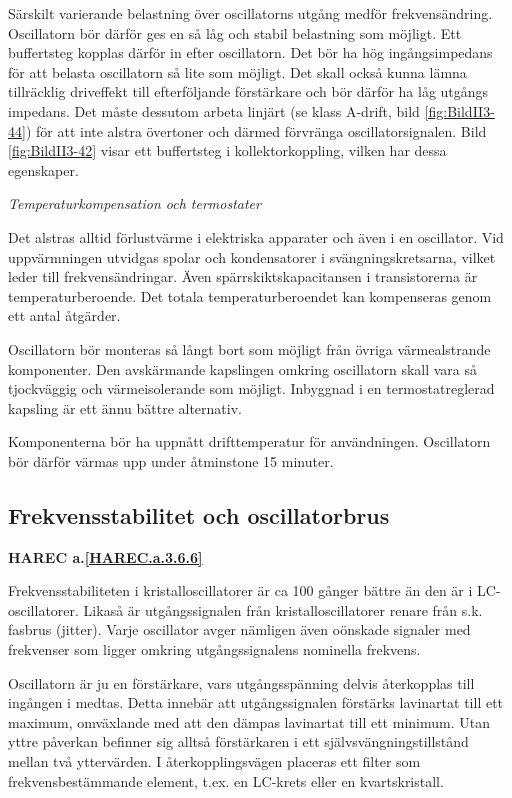 Särskilt varierande belastning över oscillatorns utgång medför
frekvensändring. Oscillatorn bör därför ges en så låg och stabil
belastning som möjligt. Ett buffertsteg kopplas därför in efter
oscillatorn. Det bör ha hög ingångsimpedans för att belasta
oscillatorn så lite som möjligt. Det skall också kunna lämna
tillräcklig driveffekt till efterföljande förstärkare och bör därför
ha låg utgångs impedans. Det måste dessutom arbeta linjärt (se klass
A-drift, bild \ref{fig:BildII3-44}) för att inte alstra övertoner och därmed
förvränga oscillatorsignalen. Bild \ref{fig:BildII3-42} visar ett buffertsteg i
kollektorkoppling, vilken har dessa egenskaper.

\emph{Temperaturkompensation och termostater}

Det alstras alltid förlustvärme i elektriska apparater och även i en
oscillator. Vid uppvärmningen utvidgas spolar och kondensatorer i
svängningskretsarna, vilket leder till frekvensändringar. Även
spärrskiktskapacitansen i transistorerna är temperaturberoende. Det
totala temperaturberoendet kan kompenseras genom ett antal åtgärder.

Oscillatorn bör monteras så långt bort som möjligt från övriga
värmealstrande komponenter. Den avskärmande kapslingen omkring
oscillatorn skall vara så tjockväggig och värmeisolerande som
möjligt. Inbyggnad i en termostatreglerad kapsling är ett ännu bättre
alternativ.

Komponenterna bör ha uppnått drifttemperatur för
användningen. Oscillatorn bör därför värmas upp under åtminstone 15
minuter.

\subsection{Frekvensstabilitet och oscillatorbrus}
\textbf{HAREC a.\ref{HAREC.a.3.6.6}\label{myHAREC.a.3.6.6}}

Frekvensstabiliteten i kristalloscillatorer är ca 100 gånger bättre än
den är i LC-oscillatorer. Likaså är utgångssignalen från
kristalloscillatorer renare från s.k. fasbrus (jitter). Varje
oscillator avger nämligen även oönskade signaler med frekvenser som
ligger omkring utgångssignalens nominella frekvens.

Oscillatorn är ju en förstärkare, vars utgångsspänning delvis
återkopplas till ingången i medtas. Detta innebär att utgångssignalen
förstärks lavinartat till ett maximum, omväxlande med att den dämpas
lavinartat till ett minimum. Utan yttre påverkan befinner sig alltså
förstärkaren i ett självsvängningstillstånd mellan två yttervärden. I
återkopplingsvägen placeras ett filter som frekvensbestämmande
element, t.ex. en LC-krets eller en kvartskristall.

